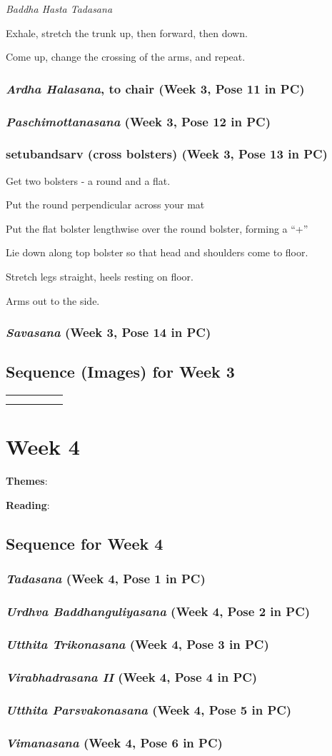 \documentclass{book}
\newcommand{\apose}[1]{\emph{#1}}
\newcommand{\ardhal}{\apose{Ardha Halasana}}
\newcommand{\badhasttad}{\apose{Baddha Hasta Tadasana}}
\newcommand{\paschi}{\apose{Paschimottanasana}}
\newcommand{\sav}{\apose{Savasana}}
\newcommand{\tad}{\apose{Tadasana}}
\newcommand{\urdbad}{\apose{Urdhva Baddhanguliyasana}}
\newcommand{\uttparsva}{\apose{Utthita Parsvakonasana}}
\newcommand{\utttrik}{\apose{Utthita Trikonasana}}
\newcommand{\vim}{\apose{Vimanasana}}
\newcommand{\viraii}{\apose{Virabhadrasana II}}
\newcommand{\poseFig}[1]{
  \begin{minipage}{1.0in}
    \texttt{[image: Figures/\{"\#1"]}.jpg}
    \captionof{figure}{{#1}}
    \label{fig:\theweek.#1}
    \vspace{1ex}
  \end{minipage}
}
\newcommand{\ardhalFig}{\poseFig{Ardha Halasana}}
\newcommand{\badhastuttFig}{\poseFig{Baddha Hasta Uttanasana}}
\newcommand{\parsvoFig}{\poseFig{Parsvottanasana}}
\newcommand{\savFig}{\poseFig{Savasana}}
\newcommand{\setubandsarvFig}{\poseFig{Setu Bandha Sarvangasana}}
\newcommand{\tadFig}{\poseFig{Tadasana}}
\newcommand{\urdbadFig}{\poseFig{Urdhva Baddhanguliyasana}}
\newcommand{\utkaFig}{\poseFig{Utkatasana}}
\newcommand{\uttparsvaFig}{\poseFig{Utthita Parsvakonasana}}
\newcommand{\utttrikFig}{\poseFig{Utthita Trikonasana}}
\newcommand{\viraiFig}{\poseFig{Virabhdrasana I}}
\newcommand{\viraiiFig}{\poseFig{Virabhadrasana II}}
\newcommand{\vrkFig}{\poseFig{Vrksasana}}
\newcommand{\PC}[2]{{\normalfont\normalsize \hfill(Week #1, Pose #2 in PC)}}
\newcommand{\newpose}[1]{{{#1}}}
\newcounter{week}
\newcounter{pose}
\newcommand{\week}[1]
{ \IfDecimal{#1}{\setcounter{week}{\integerpart}}{fooey}
  \setcounter{pose}{1}
  \chapter{Week {#1}}}
\newcommand{\pose}{\subsection}
\begin{document}
\badhasttad{}

Exhale, stretch the trunk up, then forward, then down.

Come up, change the crossing of the arms, and repeat.

\pose{\ardhal{}, to chair \PC{3}{11}}

\pose{\paschi{} \PC{3}{12}}

\pose{\newpose{setubandsarv{}} (cross bolsters) \PC{3}{13}}


Get two bolsters - a round and a flat.

Put the round perpendicular across your mat

Put the flat bolster lengthwise over the round bolster, forming a
``+''

Lie down along top bolster so that head and shoulders come to
floor.

Stretch legs straight, heels resting on floor.

Arms out to the side.

\pose{\sav{}  \PC{3}{14}}

  
\section{Sequence (Images) for Week 3}
\label{seqimags:3}

\begin{tabular}{|c|c|c|c|c|}
\tadFig{} &
\urdbadFig{} &
\vrkFig{} &
\utttrikFig{} &
\viraiiFig{} \\ \hline
\uttparsvaFig{} &
\viraiFig{} &
\utkaFig{} &
\parsvoFig{} &
\badhastuttFig{} \\ \hline
\ardhalFig{} &
\setubandsarvFig{} &
\savFig{}
\end{tabular}

\week{4}
\label{week:4}

\textbf{Themes}: 

\textbf{Reading}: 

\section{Sequence for Week 4}
\label{seq:4}

\pose{\tad{} \PC{4}{1}}

\pose{\urdbad{} \PC{4}{2}}

\pose{\utttrik{} \PC{4}{3}}

\pose{\viraii{} \PC{4}{4}}

\pose{\uttparsva{} \PC{4}{5}}

\pose{\newpose{\vim{}} \PC{4}{6}}
\end{document}
